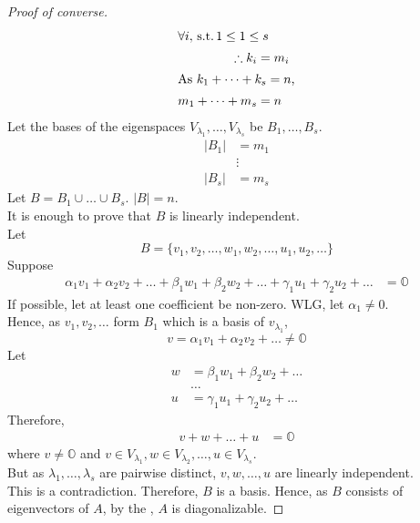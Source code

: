 \documentclass[fleqn, a4paper, 12pt]{article}
\theoremstyle{definition}
\theoremstyle{theorem}
\theoremstyle{remark}
\newcommand{\suchthat}{\mathrm{\,s.t.\,}}
\numberwithin{corollary}{theorem}
\numberwithin{equation}{theorem}
\begin{document}
\begin{proof}[Proof of converse]
	\begin{align*}
	\intertext{$\forall i, \suchthat 1 \leq 1 \leq s$}
	\therefore k_i &= m_i\\
	\intertext{As $k_1 + \dots + k_s = n$,}
	m_1 + \dots + m_s &= n
	\end{align*}
	Let the bases of the eigenspaces $V_{\lambda_1}, \dots, V_{\lambda_s}$ be $B_1, \dots, B_s$.
	\begin{align*}
		|B_1| &= m_1\\
		&\vdots\\
		|B_s| &= m_s
	\end{align*}
	Let $B = B_1 \cup \dots \cup B_s$. $|B| = n$.\\
	It is enough to prove that $B$ is linearly independent.\\
	Let 
	\begin{equation*}
		B = \{v_1, v_2, \dots, w_1, w_2, \dots, u_1, u_2, \dots\}
	\end{equation*}
	Suppose
	\begin{align*}
		\alpha_1 v_1 + \alpha_2 v_2 + \dots + \beta_1 w_1 + \beta_2 w_2 + \dots + \gamma_1 u_1 + \gamma_2 u_2 + \dots &= \mathbb{O}
	\end{align*}
	If possible, let at least one coefficient be non-zero. WLG, let $\alpha_1 \neq 0$.\\
	Hence, as $v_1, v_2, \dots$ form $B_1$ which is a basis of $v_{\lambda_1}$,
	\begin{equation*}
		v = \alpha_1 v_1 + \alpha_2 v_2 + \dots \neq \mathbb{O}
	\end{equation*}
	Let
	\begin{align*}
		w &= \beta_1 w_1 + \beta_2 w_2 + \dots\\
		&\dots\\
		u &= \gamma_1 u_1 + \gamma_2 u_2 + \dots
	\end{align*}
	Therefore,
	\begin{align*}
		v + w + \dots + u &= \mathbb{O}
	\end{align*}
		where $v \neq \mathbb{O}$ and $v \in V_{\lambda_1}, w \in V_{\lambda_2}, \dots, u \in V_{\lambda_s}$.\\
		But as $\lambda_1, \dots, \lambda_s$ are pairwise distinct, $v, w, \dots, u$ are linearly independent.\\
		This is a contradiction. Therefore, $B$ is a basis. Hence, as $B$ consists of eigenvectors of $A$, by the , $A$ is diagonalizable.
\end{proof}
\end{document}
